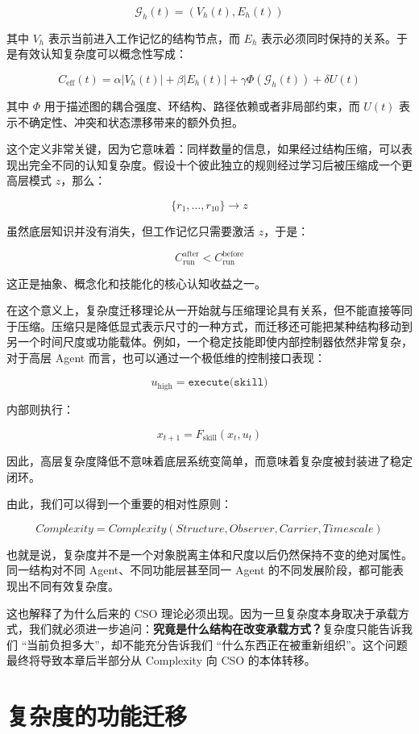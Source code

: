 \[
\mathcal{G}_h(t)
=
\left(
V_h(t),E_h(t)
\right)
\]

其中 $V_h$ 表示当前进入工作记忆的结构节点，而 $E_h$ 表示必须同时保持的关系。于是有效认知复杂度可以概念性写成：

\[
C_{\mathrm{eff}}(t)
=
\alpha |V_h(t)|
+
\beta |E_h(t)|
+
\gamma \Phi(\mathcal{G}_h(t))
+
\delta U(t)
\]

其中 $\Phi$ 用于描述图的耦合强度、环结构、路径依赖或者非局部约束，而 $U(t)$ 表示不确定性、冲突和状态漂移带来的额外负担。

这个定义非常关键，因为它意味着：同样数量的信息，如果经过结构压缩，可以表现出完全不同的认知复杂度。假设十个彼此独立的规则经过学习后被压缩成一个更高层模式 $z$，那么：

\[
\{r_1,\ldots,r_{10}\}
\rightarrow
z
\]

虽然底层知识并没有消失，但工作记忆只需要激活 $z$，于是：

\[
C_{\mathrm{run}}^{\mathrm{after}}
<
C_{\mathrm{run}}^{\mathrm{before}}
\]

这正是抽象、概念化和技能化的核心认知收益之一。

在这个意义上，复杂度迁移理论从一开始就与压缩理论具有关系，但不能直接等同于压缩。压缩只是降低显式表示尺寸的一种方式，而迁移还可能把某种结构移动到另一个时间尺度或功能载体。例如，一个稳定技能即使内部控制器依然非常复杂，对于高层 Agent 而言，也可以通过一个极低维的控制接口表现：

\[
u_{\mathrm{high}}
=
\texttt{execute(skill)}
\]

内部则执行：

\[
x_{t+1}
=
F_{\mathrm{skill}}(x_t,u_t)
\]

因此，高层复杂度降低不意味着底层系统变简单，而意味着复杂度被封装进了稳定闭环。

由此，我们可以得到一个重要的相对性原则：

\[
\boxed{
Complexity
=
Complexity(
Structure,
Observer,
Carrier,
Timescale
)
}
\]

也就是说，复杂度并不是一个对象脱离主体和尺度以后仍然保持不变的绝对属性。同一结构对不同 Agent、不同功能层甚至同一 Agent 的不同发展阶段，都可能表现出不同有效复杂度。

这也解释了为什么后来的 CSO 理论必须出现。因为一旦复杂度本身取决于承载方式，我们就必须进一步追问：\textbf{究竟是什么结构在改变承载方式？}复杂度只能告诉我们 ``当前负担多大''，却不能充分告诉我们 ``什么东西正在被重新组织''。这个问题最终将导致本章后半部分从 Complexity 向 CSO 的本体转移。

\section{复杂度的功能迁移}
\label{sec:functional-complexity-migration}


